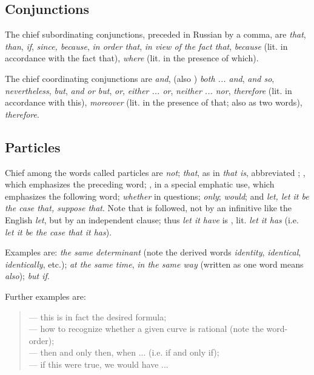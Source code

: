 \subsection*{Conjunctions}
The chief subordinating conjunctions, preceded in Russian by a comma, are  \emph{that},  \emph{than},  \emph{if},  \emph{since, because},  \emph{in order that},  \emph{in view of the fact that},  \emph{because} (lit. in accordance with the fact that),  \emph{where} (lit. in the presence of which).

The chief coordinating conjunctions are  \emph{and},  (also ) \emph{both ... and},  \emph{and so},  \emph{nevertheless},  \emph{but},  \emph{and or but},  \emph{or},  \emph{either ... or},  \emph{neither ... nor},  \emph{therefore} (lit. in accordance with this),  \emph{moreover} (lit. in the presence of that; also  as two words),  \emph{therefore}.

\subsection*{Particles}
Chief among the words called particles are  \emph{not};  \emph{that}, as in  \emph{that is}, abbreviated ; , which emphasizes the preceding word; , in a special emphatic use, which emphasizes the following word;  \emph{whether} in questions;  \emph{only};  \emph{would}; and  \emph{let, let it be the case that, suppose that}. Note that  is followed, not by an infinitive like the English \emph{let}, but by an independent clause; thus \emph{let it have} is , lit. \emph{let it has} (i.e. \emph{let it be the case that it has}).

Examples are:  \emph{the same determinant} (note the derived words  \emph{identity},  \emph{identical},  \emph{identically}, etc.);  \emph{at the same time},  \emph{in the same way} (written as one word  means \emph{also});  \emph{but if}.

Further examples are:
\begin{quote}
 --- this is in fact the desired formula;\\
 --- how to recognize whether a given curve is rational (note the word-order);\\
 --- then and only then, when ... (i.e. if and only if);\\
 --- if this were true, we would have ...
\end{quote}

